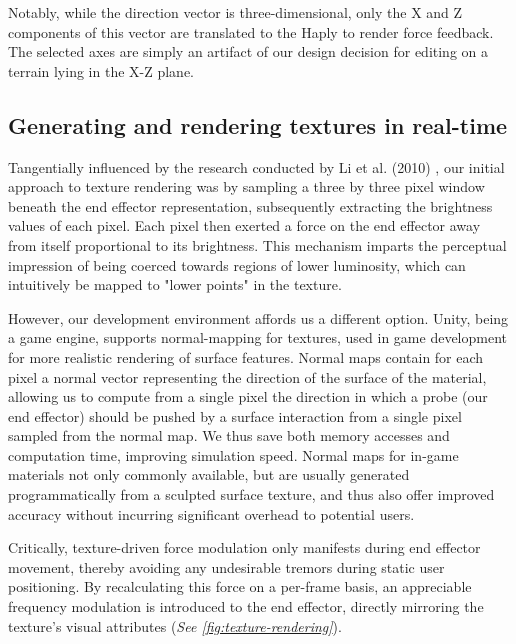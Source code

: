 Notably, while the direction vector is three-dimensional, only the X and Z components of this vector are translated to the Haply to render force feedback. The selected axes are simply an artifact of our design decision for editing on a terrain lying in the X-Z plane.

\subsection{Generating and rendering textures in real-time} \label{subsec:texture-rendering}

Tangentially influenced by the research conducted by Li et al. (2010) \cite{li2010image}, our initial approach to texture rendering was by sampling a three by three pixel window beneath the end effector representation, subsequently extracting the brightness values of each pixel. Each pixel then exerted a force on the end effector away from itself proportional to its brightness. This mechanism imparts the perceptual impression of being coerced towards regions of lower luminosity, which can intuitively be mapped to "lower points" in the texture.

However, our development environment affords us a different option. Unity, being a game engine, supports normal-mapping for textures, used in game development for more realistic rendering of surface features. Normal maps contain for each pixel a normal vector representing the direction of the surface of the material, allowing us to compute from a single pixel the direction in which a probe (our end effector) should be pushed by a surface interaction from a single pixel sampled from the normal map. We thus save both memory accesses and computation time, improving simulation speed. Normal maps for in-game materials not only commonly available, but are usually generated programmatically from a sculpted surface texture, and thus also offer improved accuracy without incurring significant overhead to potential users.

Critically, texture-driven force modulation only manifests during end effector movement, thereby avoiding any undesirable tremors during static user positioning. By recalculating this force on a per-frame basis, an appreciable frequency modulation is introduced to the end effector, directly mirroring the texture's visual attributes (\textit{See \ref{fig:texture-rendering}}).

